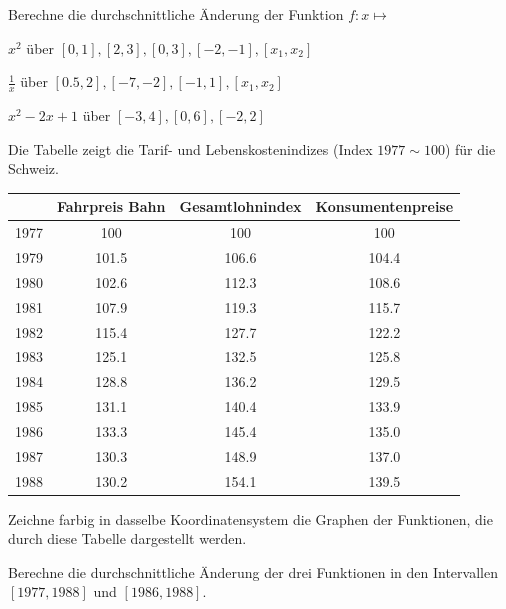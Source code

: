 \documentclass[%
11pt,%
twoside,%
titlepage,%
german,%
headsepline%
]{scrartcl}
\newcounter{deff}[section]\setcounter{deff}{0}
\renewcommand{\thedeff}{\arabic{section}.\arabic{deff}}
\newenvironment{cdef}[2][]{%
    \refstepcounter{deff}
 
    \ifstrempty{#1}%
    {\mdfsetup{%
        frametitle={%
            \tikz[baseline=(current bounding box.east),outer sep=0pt]
            \node[anchor=east,rectangle,fill=emerald]
            {\strut Definition~\thedeff};}
        }%
    }{\mdfsetup{%
        frametitle={%
            \tikz[baseline=(current bounding box.east),outer sep=0pt]
            \node[anchor=east,rectangle,fill=emerald]
            {\strut Definition~\thedeff:~#1};}%
        }%
    }%
    \mdfsetup{%
        innertopmargin=10pt,linecolor=emerald,%
        backgroundcolor=whitesmoke,%
        linewidth=2pt,topline=true,%
        frametitleaboveskip=\dimexpr-\ht\strutbox\relax%
    }
 
\begin{mdframed}[]\relax}{%
\end{mdframed}}
\begin{document}
\begin{ueb}
Berechne die durchschnittliche \"Anderung der Funktion $f:x\mapsto$
\begin{enumeratea}
\item $x^2$ \"uber $[0,1],[2,3],[0,3],[-2,-1],[x_1,x_2]$
\item $\frac{1}{x}$ \"uber $[0.5,2],[-7,-2],[-1,1],[x_1,x_2]$
\item $x^2-2x+1$ \"uber $[-3,4],[0,6],[-2,2]$
\end{enumeratea}
\label{aenderung}
\end{ueb}

\begin{ueb}
Die Tabelle zeigt die Tarif- und Lebenskostenindizes (Index $1977\sim100$) f\"ur die Schweiz.
\begin{center}
\large
\begin{tabular}{|c|c|c|c|}
\hline
 & Fahrpreis Bahn & Gesamtlohnindex & Konsumentenpreise\\ \hline
1977 & 100 & 100 & 100\\ \hline
1979 & 101.5 & 106.6 & 104.4\\ \hline
1980 & 102.6 & 112.3 & 108.6\\ \hline
1981 & 107.9 & 119.3 & 115.7\\ \hline
1982 & 115.4 & 127.7 & 122.2\\ \hline
1983 & 125.1 & 132.5 & 125.8\\ \hline
1984 & 128.8 & 136.2 & 129.5\\ \hline
1985 & 131.1 & 140.4 & 133.9\\ \hline
1986 & 133.3 & 145.4 & 135.0\\ \hline
1987 & 130.3 & 148.9 & 137.0\\ \hline
1988 & 130.2 & 154.1 & 139.5\\ \hline
\end{tabular}
\end{center}
\begin{enumeratea}
\item Zeichne farbig in dasselbe Koordinatensystem die Graphen der Funktionen, die durch diese Tabelle dargestellt werden.
\item Berechne die durchschnittliche \"Anderung der drei Funktionen in den Intervallen $[1977,1988]$ und $[1986,1988]$.
\end{enumeratea}
\end{ueb}

\end{document}
